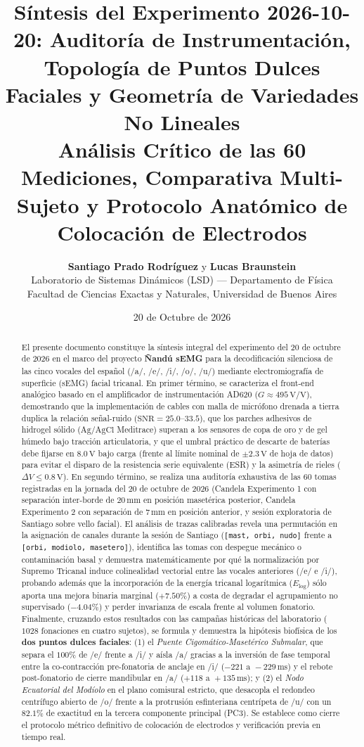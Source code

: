 \documentclass[11pt,a4paper]{article}
\title{
    \vspace{-1.4cm}
    \textbf{\Large Síntesis del Experimento 2026-10-20: Auditoría de Instrumentación, Topología de Puntos Dulces Faciales y Geometría de Variedades No Lineales}\\[0.45em]
    \large Análisis Crítico de las 60 Mediciones, Comparativa Multi-Sujeto y Protocolo Anatómico de Colocación de Electrodos
}
\author{
    \textbf{Santiago Prado Rodríguez} \quad y \quad \textbf{Lucas Braunstein}\\[0.4em]
    \normalsize Laboratorio de Sistemas Dinámicos (LSD) --- Departamento de Física\\
    \normalsize Facultad de Ciencias Exactas y Naturales, Universidad de Buenos Aires
}
\date{20 de Octubre de 2026}
\begin{document}
\maketitle

\begin{abstract}
\noindent El presente documento constituye la síntesis integral del experimento del 20 de octubre de 2026 en el marco del proyecto \textbf{Ñandú sEMG} para la decodificación silenciosa de las cinco vocales del español (/a/, /e/, /i/, /o/, /u/) mediante electromiografía de superficie (sEMG) facial tricanal. En primer término, se caracteriza el front-end analógico basado en el amplificador de instrumentación AD620 ($G \approx 495\,\text{V/V}$), demostrando que la implementación de cables con malla de micrófono drenada a tierra duplica la relación señal-ruido ($\text{SNR} = 25.0\text{--}33.5$), que los parches adhesivos de hidrogel sólido ($\text{Ag/AgCl}$ Meditrace) superan a los sensores de copa de oro y de gel húmedo bajo tracción articulatoria, y que el umbral práctico de descarte de baterías debe fijarse en $8.0\,\text{V}$ bajo carga (frente al límite nominal de $\pm 2.3\,\text{V}$ de hoja de datos) para evitar el disparo de la resistencia serie equivalente (ESR) y la asimetría de rieles ($\Delta V \le 0.8\,\text{V}$). En segundo término, se realiza una auditoría exhaustiva de las 60 tomas registradas en la jornada del 20 de octubre de 2026 (Candela Experimento 1 con separación inter-borde de $20\,\text{mm}$ en posición masetérica posterior, Candela Experimento 2 con separación de $7\,\text{mm}$ en posición anterior, y sesión exploratoria de Santiago sobre vello facial). El análisis de trazas calibradas revela una permutación en la asignación de canales durante la sesión de Santiago (\texttt{[mast, orbi, nudo]} frente a \texttt{[orbi, modiolo, masetero]}), identifica las tomas con despegue mecánico o contaminación basal y demuestra matemáticamente por qué la normalización por Supremo Tricanal induce colinealidad vectorial entre las vocales anteriores (/e/ e /i/), probando además que la incorporación de la energía tricanal logarítmica ($E_{\text{log}}$) sólo aporta una mejora binaria marginal ($+7.50\%$) a costa de degradar el agrupamiento no supervisado ($-4.04\%$) y perder invarianza de escala frente al volumen fonatorio. Finalmente, cruzando estos resultados con las campañas históricas del laboratorio ($1028$ fonaciones en cuatro sujetos), se formula y demuestra la hipótesis biofísica de los \textbf{dos puntos dulces faciales}: (1) el \textit{Puente Cigomático-Masetérico Submalar}, que separa el $100\%$ de /e/ frente a /i/ y aísla /a/ gracias a la inversión de fase temporal entre la co-contracción pre-fonatoria de anclaje en /i/ ($-221\text{ a }-229\,\text{ms}$) y el rebote post-fonatorio de cierre mandibular en /a/ ($+118\text{ a }+135\,\text{ms}$); y (2) el \textit{Nodo Ecuatorial del Modíolo} en el plano comisural estricto, que desacopla el redondeo centrífugo abierto de /o/ frente a la protrusión esfinteriana centrípeta de /u/ con un $82.1\%$ de exactitud en la tercera componente principal (PC3). Se establece como cierre el protocolo métrico definitivo de colocación de electrodos y verificación previa en tiempo real.
\end{abstract}
\end{document}
